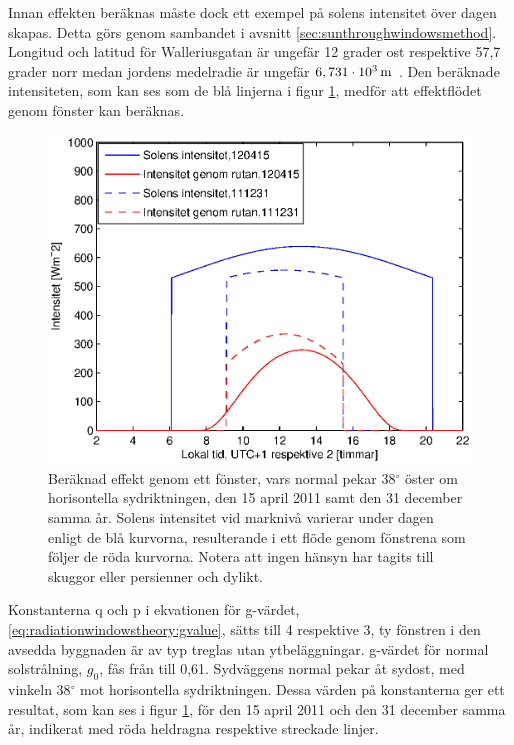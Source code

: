 Innan effekten beräknas måste dock ett exempel på solens intensitet över dagen skapas. Detta görs genom sambandet i avsnitt \ref{sec:sunthroughwindowsmethod}. Longitud och latitud för Walleriusgatan är ungefär 12 grader ost respektive 57,7 grader norr medan jordens medelradie är ungefär $\unit[6,731\cdot 10^{3}]{m}$ \cite{physicshandbook}. Den beräknade intensiteten, som kan ses som de blå linjerna i figur \ref{fig:effekt0415and1231}, medför att effektflödet genom fönster kan beräknas.

\begin{figure}[hpbt]
\centering
\includegraphics[scale=0.7]{images/effekt0415and1231.eps}
\caption{\label{fig:effekt0415and1231} Beräknad effekt genom ett fönster, vars normal pekar 38$^{\circ}$ öster om horisontella sydriktningen, den 15 april 2011 samt den 31 december samma år. Solens intensitet vid marknivå varierar under dagen enligt de blå kurvorna, resulterande i ett flöde genom fönstrena som följer de röda kurvorna. Notera att ingen hänsyn har tagits till skuggor eller persienner och dylikt.}
\end{figure}

Konstanterna q och p i ekvationen för g-värdet, \ref{eq:radiationwindowstheory:gvalue}, sätts till 4 respektive 3, ty fönstren i den avsedda byggnaden är av typ treglas utan ytbeläggningar. g-värdet för normal solstrålning, $g_0$, fås från \cite{ASHRAE09} till 0,61. Sydväggens normal pekar åt sydost, med vinkeln 38$^{\circ}$ mot horisontella sydriktningen. Dessa värden på konstanterna ger ett resultat, som kan ses i figur \ref{fig:effekt0415and1231}, för den 15 april 2011 och den 31 december samma år, indikerat med röda heldragna respektive streckade linjer.

